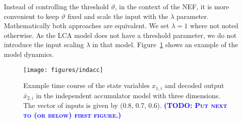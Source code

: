 \documentclass[10pt,letterpaper]{article}
\makeatletter
\newcommand{\todo}[1]{\textbf{\textsc{\textcolor{blue}{(TODO\@: #1)}}}}
\makeatother
\begin{document}
Instead of controlling the threshold $\vartheta$, in the context of the NEF, it 
is more convenient to keep $\vartheta$ fixed and scale the input with the 
$\lambda$ parameter. Mathematically both approaches are equivalent. We set 
$\lambda = 1$ where not noted otherwise. As the LCA model does not have 
a threshold parameter, we do not introduce the input scaling $\lambda$ in that 
model.  Figure~\ref{fig:indacc} shows an example of the model dynamics.
\begin{figure}
    \centering
    \texttt{[image: figures/indacc]}
    \caption{Example time course of the state variables $x_{1,i}$ and decoded 
        output $\bar{x}_{2,i}$ in the independent accumulator model with three 
        dimensions. The vector of inputs is given by (0.8, 0.7, 0.6).
        \todo{Put next to (or below) first figure.}
    }\label{fig:indacc}
\end{figure}
\end{document}
